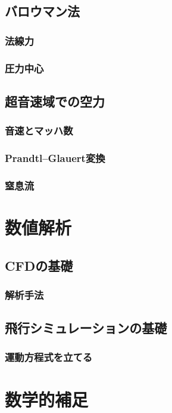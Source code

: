 \documentclass[uplatex,dvipdfmx,a4j,11pt]{jsreport}
\numberwithin{equation}{chapter}
\begin{document}
\section{バロウマン法}
\subsection{法線力}
\subsection{圧力中心}


\section{超音速域での空力}
\subsection{音速とマッハ数}

\subsection{Prandtl--Glauert変換}

\subsection{窒息流}


\chapter{数値解析}

\section{CFDの基礎}
\subsection{解析手法}

\section{飛行シミュレーションの基礎}
\subsection{運動方程式を立てる}


\appendix

\chapter{数学的補足}
\end{document}
